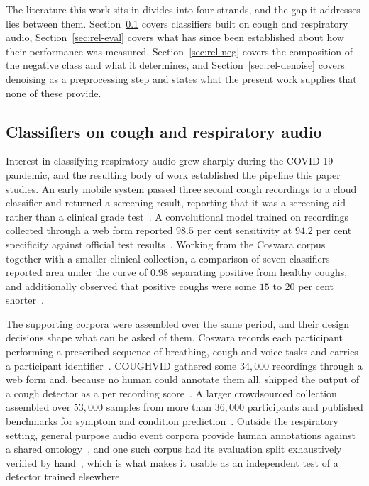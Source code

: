 \documentclass[pdflatex,sn-mathphys-num]{sn-jnl}
\begin{document}
The literature this work sits in divides into four strands, and the gap it addresses lies
between them. Section~\ref{sec:rel-class} covers classifiers built on cough and
respiratory audio, Section~\ref{sec:rel-eval} covers what has since been established
about how their performance was measured, Section~\ref{sec:rel-neg} covers the
composition of the negative class and what it determines, and
Section~\ref{sec:rel-denoise} covers denoising as a preprocessing step and states what
the present work supplies that none of these provide.

\subsection{Classifiers on cough and respiratory audio}\label{sec:rel-class}

Interest in classifying respiratory audio grew sharply during the COVID-19 pandemic, and
the resulting body of work established the pipeline this paper studies. An early mobile
system passed three second cough recordings to a cloud classifier and returned a
screening result, reporting that it was a screening aid rather than a clinical grade
test~\cite{imran2020}. A convolutional model trained on recordings collected through a web
form reported $98.5$ per cent sensitivity at $94.2$ per cent specificity against official
test results~\cite{laguarta2020}. Working from the Coswara corpus together with a smaller
clinical collection, a comparison of seven classifiers reported area under the curve of
$0.98$ separating positive from healthy coughs, and additionally observed that positive
coughs were some $15$ to $20$ per cent shorter~\cite{pahar2021}.

The supporting corpora were assembled over the same period, and their design decisions
shape what can be asked of them. Coswara records each participant performing a prescribed
sequence of breathing, cough and voice tasks and carries a participant
identifier~\cite{coswara2020}. COUGHVID gathered some $34{,}000$ recordings through a web
form and, because no human could annotate them all, shipped the output of a cough
detector as a per recording score~\cite{coughvid2021}. A larger crowdsourced collection
assembled over $53{,}000$ samples from more than $36{,}000$ participants and published
benchmarks for symptom and condition prediction~\cite{xia2021}. Outside the respiratory
setting, general purpose audio event corpora provide human annotations against a shared
ontology~\cite{gemmeke2017}, and one such corpus had its evaluation split exhaustively
verified by hand~\cite{fsd50k2022}, which is what makes it usable as an independent test
of a detector trained elsewhere.
\end{document}
